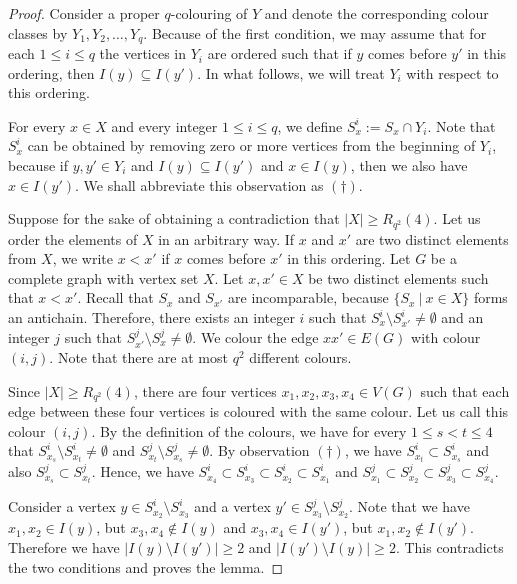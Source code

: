 \documentclass[10pt,a4paper]{amsart}
\begin{document}
\begin{proof}
Consider a proper $q$-colouring of $Y$ and denote the corresponding colour classes by $Y_1, Y_2, \ldots, Y_q$. Because of the first condition, we may assume that for each $1 \leq i \leq q$ the vertices in $Y_i$ are ordered such that if $y$ comes before $y'$ in this ordering, then $I(y) \subseteq I(y')$. In what follows, we will treat $Y_i$ with respect to this ordering.

For every $x \in X$ and every integer $1 \leq i \leq q$, we define $S_x^i := S_x \cap Y_i$. Note that $S_x^i$ can be obtained by removing zero or more vertices from the beginning of $Y_i$, because if $y,y' \in Y_i$ and $I(y)\subseteq I(y')$ and $x \in I(y)$, then we also have $x \in I(y')$. We shall abbreviate this observation as $(\dagger)$.

Suppose for the sake of obtaining a contradiction that $|X| \geq R_{q^2}(4)$. Let us order the elements of $X$ in an arbitrary way. If $x$ and $x'$ are two distinct elements from $X$, we write $x<x'$ if $x$ comes before $x'$ in this ordering. Let $G$ be a complete graph with vertex set $X$. Let $x, x' \in X$ be two distinct elements such that $x<x'$. Recall that $S_x$ and $S_{x'}$ are incomparable, because $\{S_x~|~x \in X\}$ forms an antichain. Therefore, there exists an integer $i$ such that $S_x^i \setminus S_{x'}^i \neq \emptyset$ and an integer $j$ such that $S_{x'}^j \setminus S_x^j \neq \emptyset$. We colour the edge $xx' \in E(G)$ with colour $(i,j)$. Note that there are at most $q^2$ different colours.

Since $|X| \geq R_{q^2}(4)$, there are four vertices $x_1, x_2, x_3, x_4 \in V(G)$ such that each edge between these four vertices is coloured with the same colour. Let us call this colour $(i,j)$. By the definition of the colours, we have for every $1 \leq s < t \leq 4$ that $S_{x_s}^i \setminus S_{x_t}^i \neq \emptyset$ and $S_{x_t}^j \setminus S_{x_s}^j \neq \emptyset$. By observation $(\dagger)$, we have $S_{x_t}^i \subset S_{x_s}^i$ and also $S_{x_s}^j \subset S_{x_t}^j$. Hence, we have $S_{x_4}^i \subset S_{x_3}^i \subset S_{x_2}^i \subset S_{x_1}^i$ and $S_{x_1}^j \subset S_{x_2}^j \subset S_{x_3}^j \subset S_{x_4}^j$.

Consider a vertex $y \in S_{x_2}^i \setminus S_{x_3}^i$ and a vertex $y' \in S_{x_3}^j \setminus S_{x_2}^j$. Note that we have $x_1, x_2 \in I(y)$, but $x_3, x_4 \notin I(y)$ and $x_3, x_4 \in I(y')$, but $x_1, x_2 \notin I(y')$. Therefore we have $|I(y) \setminus I(y')| \geq 2$ and $|I(y') \setminus I(y)| \geq 2$. This contradicts the two conditions and proves the lemma.
\end{proof}
\end{document}
